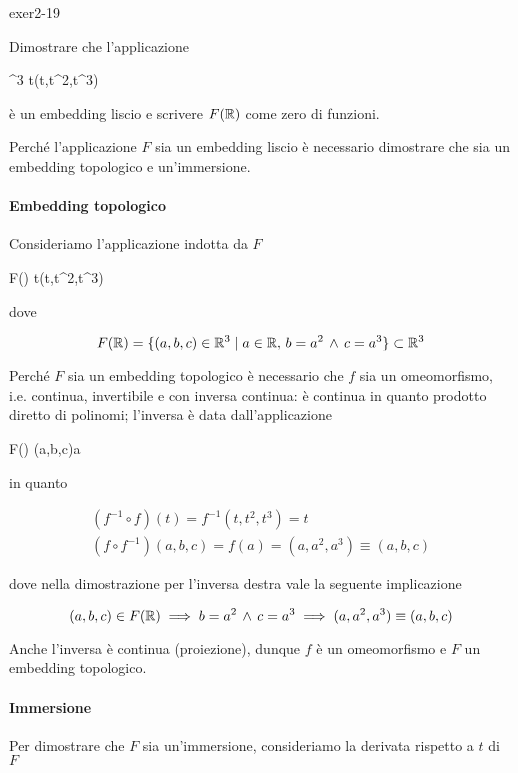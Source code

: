 {exer2-19}
{
Dimostrare che l'applicazione

	{\R}{\R^{3}}
	{t}{(t,t^{2},t^{3})}

è un embedding liscio e scrivere $ F(\mathbb{R}) $ come zero di funzioni.
}
{
Perché l'applicazione $ F $ sia un embedding liscio è necessario dimostrare che sia un embedding topologico e un'immersione.

\paragraph{Embedding topologico}

Consideriamo l'applicazione indotta da $ F $

	{\R}{F(\R)}
	{t}{(t,t^{2},t^{3})}

dove

\begin{equation}
	F(\mathbb{R}) = \{ (a,b,c) \in \mathbb{R}^{3} \mid a \in \mathbb{R} , \, b = a^{2} \, \wedge \, c = a^{3} \} \subset \mathbb{R}^{3}
\end{equation}

Perché $ F $ sia un embedding topologico è necessario che $ f $ sia un omeomorfismo, i.e. continua, invertibile e con inversa continua: è continua in quanto prodotto diretto di polinomi; l'inversa è data dall'applicazione

	{F(\R)}{\R}
	{(a,b,c)}{a}

in quanto

\begin{gather}
	(f^{-1} \circ f) (t) = f^{-1}(t,t^{2},t^{3}) = t \\
	(f \circ f^{-1}) (a,b,c) = f(a) = (a,a^{2},a^{3}) \equiv (a,b,c)
\end{gather}

dove nella dimostrazione per l'inversa destra vale la seguente implicazione

\begin{equation}
	(a,b,c) \in F(\R) %
	\implies %
	b = a^{2} \, \wedge \, c = a^{3} %
	\implies %
	(a,a^{2},a^{3}) \equiv (a,b,c)
\end{equation}

Anche l'inversa è continua (proiezione), dunque $ f $ è un omeomorfismo e $ F $ un embedding topologico.

\paragraph{Immersione}

Per dimostrare che $ F $ sia un'immersione, consideriamo la derivata rispetto a $ t $ di $ F $

}

